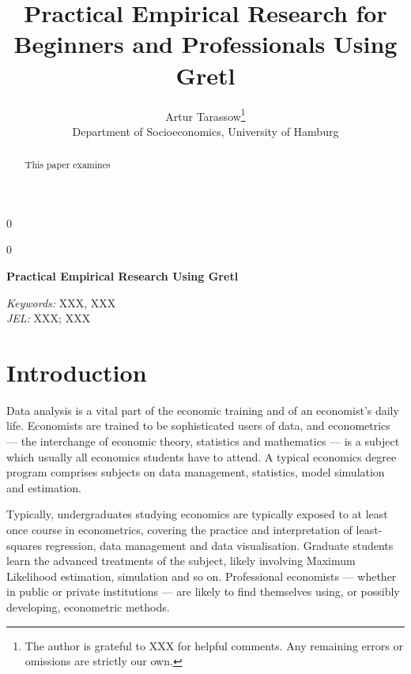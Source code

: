 \documentclass[11pt]{article}
\newcommand{\blind}{0}
\begin{document}
%

\def\spacingset#1{\renewcommand{\baselinestretch}%
	{#1}\small\normalsize} \spacingset{1}



\blind
{
	\title{\bf Practical Empirical Research for Beginners and Professionals Using Gretl}
	\author{Artur Tarassow\thanks{
			The author is grateful to XXX for helpful comments. Any remaining errors or omissions are strictly our own.}\hspace{.2cm}\\
		Department of Socioeconomics, University of Hamburg}
	\maketitle
} \fi

\blind
{
	\bigskip
	\bigskip
	\bigskip
	\begin{center}
		{\LARGE\bf Practical Empirical Research Using Gretl}
	\end{center}
	\medskip
} \fi

\bigskip
\begin{abstract}
	This paper examines 
\end{abstract}

\noindent%
{\it Keywords:} XXX, XXX\\
{\it JEL:} XXX; XXX

\vfill

\newpage
\doublespacing

\newpage
\section{Introduction}
\label{sec:intro}
Data analysis is a vital part of the economic training and of an economist's daily life. Economists are trained to be sophisticated users of data, and econometrics --- the interchange of economic theory, statistics and mathematics --- is a subject which usually all economics students have to attend. A typical economics degree program comprises subjects on data management, statistics, model simulation and estimation.

Typically, undergraduates studying economics are typically exposed to at least once course in econometrics, covering the practice and interpretation of least-squares regression, data management and data visualisation. Graduate students learn the advanced treatments of the subject, likely involving Maximum Likelihood estimation, simulation and so on. Professional economists --- whether in public or private institutions --- are likely to find themselves using, or possibly developing, econometric methods.
\end{document}
